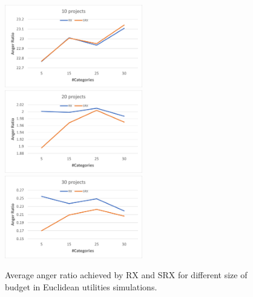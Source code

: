 \documentclass[runningheads]{llncs}
\begin{document}
\begin{subappendices}
\begin{figure}[t]
\begin{center}
\includegraphics[width=6cm]{simulation/unit_cost_ar_10.png}
\includegraphics[width=6cm]{simulation/unit_cost_ar_20.png}
\includegraphics[width=6cm]{simulation/unit_cost_ar_30.png}
\caption{Average anger ratio achieved by RX and SRX for different size of budget in Euclidean utilities simulations.
}\label{fig:ar_all1}
\end{center}
\end{figure}




\end{subappendices}
\end{document}
